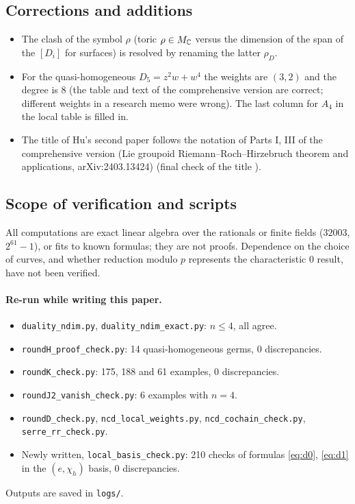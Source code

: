 \subsection{Corrections and additions}
\begin{itemize}
\item The clash of the symbol $\rho$ (toric $\rho\in M_\mathbb C$ versus the dimension of the span of the $[D_i]$ for surfaces) is resolved by renaming the latter $\rho_D$.
\item For the quasi-homogeneous $D_5=z^2w+w^4$ the weights are $(3,2)$ and the degree is 8 (the table and text of the comprehensive version are correct; different weights in a research memo were wrong). The last column for $A_4$ in the local table is filled in.
\item The title of Hu's second paper follows the notation of Parts I, III of the comprehensive version (Lie groupoid Riemann--Roch--Hirzebruch theorem and applications, arXiv:2403.13424) (final check of the title \tQ).
\end{itemize}

\subsection{Scope of verification and scripts}
All computations are exact linear algebra over the rationals or finite fields ($32003$, $2^{61}-1$), or fits to known formulas; they are not proofs. Dependence on the choice of curves, and whether reduction modulo $p$ represents the characteristic 0 result, have not been verified.
\paragraph{Re-run while writing this paper.}
\begin{itemize}
\item \texttt{duality\_ndim.py}, \texttt{duality\_ndim\_exact.py}: $n\le4$, all agree.
\item \texttt{roundH\_proof\_check.py}: 14 quasi-homogeneous germs, 0 discrepancies.
\item \texttt{roundK\_check.py}: 175, 188 and 61 examples, 0 discrepancies.
\item \texttt{roundJ2\_vanish\_check.py}: 6 examples with $n=4$.
\item \texttt{roundD\_check.py}, \texttt{ncd\_local\_weights.py}, \texttt{ncd\_cochain\_check.py}, \texttt{serre\_rr\_check.py}.
\item Newly written, \texttt{local\_basis\_check.py}: 210 checks of formulas \eqref{eq:d0}, \eqref{eq:d1} in the $(e,\chi_h)$ basis, 0 discrepancies.
\end{itemize}
Outputs are saved in \texttt{logs/}.
